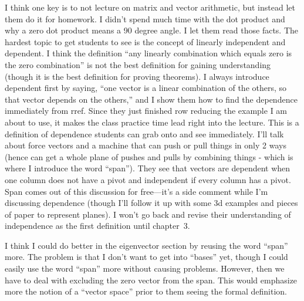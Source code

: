 I think one key is to not lecture on matrix and vector arithmetic, but instead let them do it for homework.  I didn't spend much time with the dot product and why a zero dot product means a 90 degree angle.  I let them read those facts.  The hardest topic to get students to see is the concept of linearly independent and dependent.  I think the definition ``any linearly combination which equals zero is the zero combination'' is not the best definition for gaining understanding (though it is the best definition for proving theorems).  I always introduce dependent first by saying, ``one vector is a linear combination of the others, so that vector depends on the others,'' and I show them how to find the dependence immediately from rref. Since they just finished row reducing the example I am about to use, it makes the class practice time lead right into the lecture.  This is a definition of dependence students can grab onto and see immediately. I'll talk about force vectors and a machine that can push or pull things in only 2 ways (hence can get a whole plane of pushes and pulls by combining things - which is where I introduce the word ``span'').  They see that vectors are dependent when one column does not have a pivot and independent if every column has a pivot. Span comes out of this discussion for free---it's a side comment while I'm discussing dependence (though I'll follow it up with some 3d examples and pieces of paper to represent planes). I won't go back and revise their understanding of independence as the first definition until chapter~3.

I think I could do better in the eigenvector section by reusing the word ``span'' more.  The problem is that I don't want to get into ``bases'' yet, though I could easily use the word ``span'' more without causing problems. However, then we have to deal with excluding the zero vector from the span. This would emphasize more the notion of a ``vector space'' prior to them seeing the formal definition.
